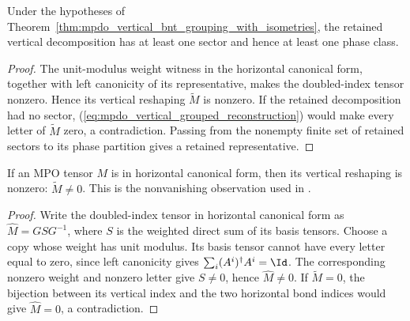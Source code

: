 \begin{lemma}
    \label{lem:mpdo_vertical_retained_class_nonempty}
    \leanok
    Under the hypotheses of
    Theorem~\ref{thm:mpdo_vertical_bnt_grouping_with_isometries}, the retained
    vertical decomposition has at least one sector and hence at least one
    phase class.
\end{lemma}

\begin{proof}
    \leanok
    The unit-modulus weight witness in the horizontal canonical form, together
    with left canonicity of its representative, makes the doubled-index tensor
    nonzero. Hence its vertical reshaping $\widetilde M$ is nonzero. If the
    retained decomposition had no sector,
    (\ref{eq:mpdo_vertical_grouped_reconstruction}) would make every letter of
    $\widetilde M$ zero, a contradiction. Passing from the nonempty finite set
    of retained sectors to its phase partition gives a retained representative.
\end{proof}

\begin{theorem}
    \label{thm:mpdo_vertical_tensor_nonzero}
    \leanok
    If an MPO tensor $M$ is in horizontal canonical form, then its vertical
    reshaping is nonzero: $\widetilde M\ne0$.
    This is the nonvanishing observation used in
    \cite[Proposition~4.13, lines~1895--1902]{Cirac2016MPDO_arXiv}.
\end{theorem}

\begin{proof}
    \leanok
    Write the doubled-index tensor in horizontal canonical form as
    $\widehat M=GSG^{-1}$, where $S$ is the weighted direct sum of its basis
    tensors. Choose a copy whose weight has unit modulus. Its basis tensor
    cannot have every letter equal to zero, since left canonicity gives
    $\sum_i(A^i)^\dagger A^i=\Id$.
    The corresponding nonzero weight and nonzero letter give $S\ne0$, hence
    $\widehat M\ne0$. If $\widetilde M=0$, the bijection between its vertical
    index and the two horizontal bond indices would give $\widehat M=0$, a
    contradiction.
\end{proof}

